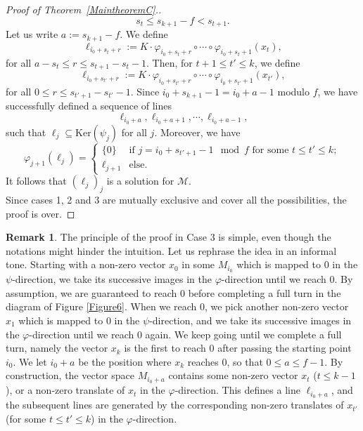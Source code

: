\documentclass[12pt]{amsart}
\theoremstyle{definition}
\newtheorem{remark}[theorem]{Remark}
\newcommand{\<}{\langle}   %
\renewcommand{\>}{\rangle} %
\begin{document}
\begin{proof}[Proof of Theorem~\ref{MaintheoremC}.]
    \begin{equation*}
        s_t \leq s_{k+1}-f < s_{t+1}.
    \end{equation*}
    Let us write $a := s_{k+1}-f$. We define 
    \begin{equation*}
        \ell_{i_0+s_t+r} := K\cdot \varphi_{i_0+s_t+r} \circ \cdots \circ \varphi_{i_0+s_t+1}(x_t),
    \end{equation*}
    for all $a - s_t \leq r \leq s_{t+1}-s_t-1$. Then, for $t+1 \leq t' \leq k$, we define 
    \begin{equation*}
        \ell_{i_0+s_{t'}+r} := K \cdot \varphi_{i_0+s_{t'}+r} \circ \cdots \circ \varphi_{i_0+s_{t'}+1}(x_{t'}),
    \end{equation*}
    for all $0 \leq r \leq s_{t'+1}-s_{t'}-1$. Since $i_0 + s_{k+1}-1 = i_0 + a - 1$ modulo $f$, we have successfully defined a sequence of lines 
    \begin{equation*}
        \ell_{i_0+a}, \ell_{i_0+a+1}, \cdots , \ell_{i_0+a-1},
    \end{equation*}
    such that $\ell_j \subseteq \mathrm{Ker}(\psi_j)$ for all $j$. Moreover, we have 
    \begin{equation*}
        \varphi_{j+1}(\ell_j) = \begin{cases}
            \{0\} & \text{if } j = i_0 + s_{t'+1}-1\mod f \text{ for some } t \leq t' \leq k;\\
            \ell_{j+1} & \text{else}.
        \end{cases}
    \end{equation*}
    It follows that $(\ell_j)_j$ is a solution for $\mathcal M$. \\

    Since cases 1, 2 and 3 are mutually exclusive and cover all the possibilities, the proof is over.\end{proof}

    \begin{remark}
        The principle of the proof in Case 3 is simple, even though the notations might hinder the intuition. Let us rephrase the idea in an informal tone. Starting with a non-zero vector $x_0$ in some $M_{i_0}$ which is mapped to $0$ in the $\psi$-direction, we take its successive images in the $\varphi$-direction until we reach $0$. By assumption, we are guaranteed to reach $0$ before completing a full turn in the diagram of Figure \ref{Figure6}. When we reach $0$, we pick another non-zero vector $x_1$ which is mapped to $0$ in the $\psi$-direction, and we take its successive images in the $\varphi$-direction until we reach $0$ again. We keep going until we complete a full turn, namely the vector $x_k$ is the first to reach $0$ after passing the starting point $i_0$. We let $i_0+a$ be the position where $x_k$ reaches $0$, so that $0 \leq a \leq f-1$. By construction, the vector space $M_{i_0+a}$ contains some non-zero vector $x_t$ ($t \leq k-1$), or a non-zero translate of $x_t$ in the $\varphi$-direction. This defines a line $\ell_{i_0+a}$, and the subsequent lines are generated by the corresponding non-zero translates of $x_{t'}$ (for some $t \leq t' \leq k$) in the $\varphi$-direction. 
    \end{remark}
\end{document}
